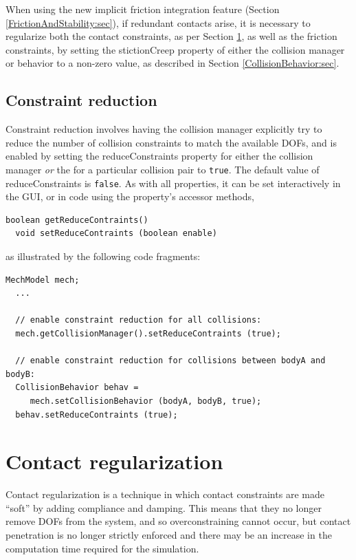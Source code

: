 \begin{sideblock}
When using the new implicit friction integration feature (Section
\ref{FrictionAndStability:sec}), if redundant contacts arise, it is
necessary to regularize both the contact constraints, as per Section
\ref{ContactRegularization:sec}, as well as the friction constraints,
by setting the {\sf stictionCreep} property of either the collision
manager or behavior to a non-zero value, as described in Section
\ref{CollisionBehavior:sec}.
\end{sideblock}

\subsection{Constraint reduction}
\label{ConstraintReduction:sec}

Constraint reduction involves having the collision manager explicitly
try to reduce the number of collision constraints to match the
available DOFs, and is enabled by setting the {\sf reduceConstraints}
property for either the collision manager
{\it or} the 
for a particular collision pair to {\tt true}. The default value of
{\sf reduceConstraints} is {\tt false}. As with all properties, it can
be set interactively in the GUI, or in code using the property's
accessor methods,
%
\begin{lstlisting}[]
  boolean getReduceContraints()
  void setReduceContraints (boolean enable)
\end{lstlisting}
%
as illustrated by the following code fragments:
%
\begin{lstlisting}[]
  MechModel mech;
  ...

  // enable constraint reduction for all collisions:
  mech.getCollisionManager().setReduceContraints (true);

  // enable constraint reduction for collisions between bodyA and bodyB:
  CollisionBehavior behav = 
     mech.setCollisionBehavior (bodyA, bodyB, true);
  behav.setReduceContraints (true);
\end{lstlisting}
%

\section{Contact regularization}
\label{ContactRegularization:sec}

Contact regularization is a technique in which contact
constraints are made ``soft'' by adding compliance and damping.  This
means that they no longer remove DOFs from the system, and so
overconstraining cannot occur, but contact penetration is no longer
strictly enforced and there may be an increase in the computation time
required for the simulation. 

